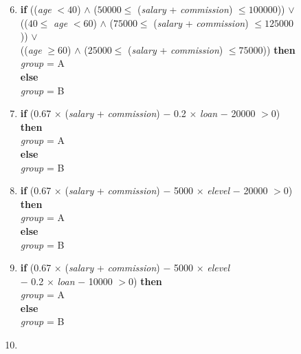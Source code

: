 \begin{figure}
\begin{enumerate}
\setcounter{enumi}{5}
\item
{\bf if} (({\it age} $< 40$) $\land$ ($50000 \le$ ({\it salary} + {\it commission}) $\le 100000$)) $\lor$\\
\hspace*{1em} (($40 \le$ {\it age} $< 60$) $\land$ ($75000 \le$ ({\it salary} + {\it commission}) $\le 125000$)) $\lor$\\
\hspace*{1em} (({\it age} $\ge 60$) $\land$ ($25000 \le$ ({\it salary} + {\it commission}) $\le 75000$)) {\bf then}\\
\hspace*{1em} {\it group} = A\\
{\bf else}\\
\hspace*{1em} {\it group} = B\\
\item
{\bf if} (0.67 $\times$ ({\it salary} + {\it commission}) $-$ 0.2 $\times$ {\it loan} $-$ 20000 $> 0$) {\bf then}\\
\hspace*{1em} {\it group} = A\\
{\bf else}\\
\hspace*{1em} {\it group} = B\\
\item
{\bf if} (0.67 $\times$ ({\it salary} + {\it commission}) $-$ 5000 $\times$ {\it elevel} $-$ 20000 $> 0$) {\bf then}\\
\hspace*{1em} {\it group} = A\\
{\bf else}\\
\hspace*{1em} {\it group} = B\\
\item
{\bf if} (0.67 $\times$ ({\it salary} + {\it commission}) $-$ 5000 $\times$ {\it elevel}\\
\hspace*{1em} $-$ 0.2 $\times$ {\it loan} $-$ 10000 $> 0$) {\bf then}\\
\hspace*{1em} {\it group} = A\\
{\bf else}\\
\hspace*{1em} {\it group} = B\\
\item

\end{enumerate}
\end{figure}
